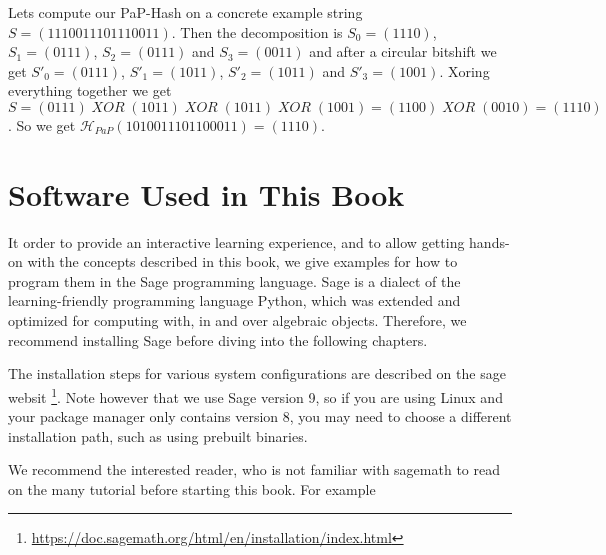 \begin{example}
Lets compute our PaP-Hash on a concrete example string $S=(1110011101110011)$. Then the decomposition is $S_0=(1110)$, $S_1=(0111)$, $S_2=(0111)$ and $S_3=(0011)$ and after a circular bitshift we get $S'_0=(0111)$, $S'_1=(1011)$, $S'_2=(1011)$ and $S'_3=(1001)$. Xoring everything together we get $S= (0111) \; XOR \; (1011)\; XOR \; (1011)\; XOR \; (1001) = (1100) \; XOR\;
(0010) = (1110)$. So we get $\mathcal{H}_{PaP}(1010 0111 0110 0011) = (1110)$.
\end{example}


\section{Software Used in This Book}

It order to provide an interactive learning experience, and to allow getting hands-on with the concepts described in this book, we give examples for how to program them in the Sage programming language. Sage is a dialect of the learning-friendly programming language Python, which was extended and optimized for computing with, in and over algebraic objects. Therefore, we recommend installing Sage before diving into the following chapters.

The installation steps for various system configurations are described on the sage websit \footnote{\url{https://doc.sagemath.org/html/en/installation/index.html}}. Note however that we use Sage version 9, so if you are using Linux and your package manager only contains version 8, you may need to choose a different installation path, such as using prebuilt binaries.

We recommend the interested reader, who is not familiar with sagemath to read on the many tutorial before starting this book. For example 



